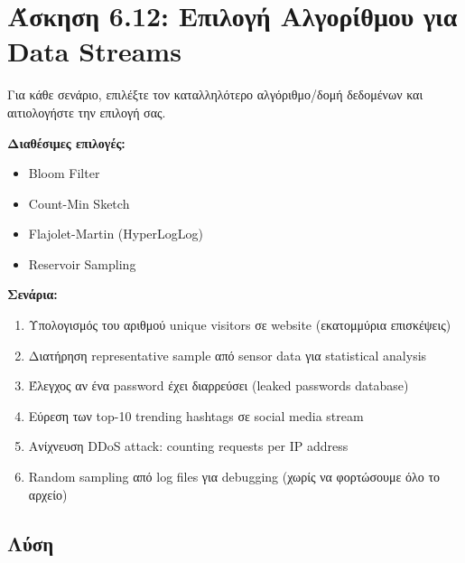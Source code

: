 \section{Άσκηση 6.12: Επιλογή Αλγορίθμου για Data Streams}

\begin{formulabox}[Εκφώνηση]
Για κάθε σενάριο, επιλέξτε τον καταλληλότερο αλγόριθμο/δομή δεδομένων και
αιτιολογήστε την επιλογή σας.

\textbf{Διαθέσιμες επιλογές:}
\begin{itemize}
    \item Bloom Filter
    \item Count-Min Sketch
    \item Flajolet-Martin (HyperLogLog)
    \item Reservoir Sampling
\end{itemize}

\textbf{Σενάρια:}
\begin{enumerate}
    \item Υπολογισμός του αριθμού unique visitors σε website (εκατομμύρια επισκέψεις)
    \item Διατήρηση representative sample από sensor data για statistical analysis
    \item Έλεγχος αν ένα password έχει διαρρεύσει (leaked passwords database)
    \item Εύρεση των top-10 trending hashtags σε social media stream
    \item Ανίχνευση DDoS attack: counting requests per IP address
    \item Random sampling από log files για debugging (χωρίς να φορτώσουμε όλο το αρχείο)
\end{enumerate}
\end{formulabox}

\subsection*{Λύση}

